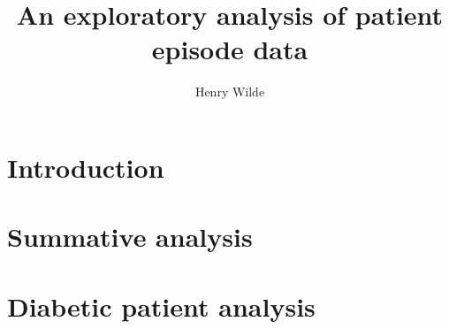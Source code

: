 \documentclass[12pt]{article}
\title{An exploratory analysis of patient episode data}
\author{Henry Wilde}
\begin{document}
\maketitle

\section{Introduction}\label{sec:intro}


\section{Summative analysis}\label{sec:summative}


\section{Diabetic patient analysis}\label{sec:diabetic}


\clearpage


\end{document}
